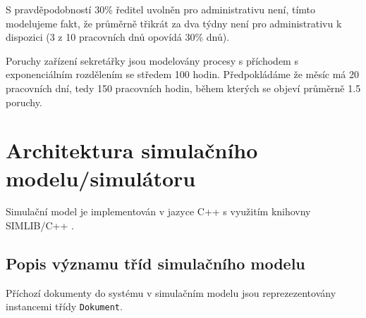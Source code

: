 \documentclass[12pt,a4paper]{article}
\begin{document}
S pravděpodobností 30\% ředitel uvolněn pro administrativu není, tímto modelujeme fakt, že průměrně třikrát za dva týdny není pro administrativu k dispozici (3 z 10 pracovních dnů opovídá 30\% dnů).

Poruchy zařízení sekretářky jsou modelovány procesy s příchodem s exponenciálním rozdělením se středem 100 hodin. Předpokládáme že měsíc má 20 pracovních dní, tedy 150 pracovních hodin, během kterých se objeví průměrně 1.5 poruchy.





\newpage


\section{Architektura simulačního modelu/simulátoru}

Simulační model je implementován v jazyce C++ s využitím knihovny SIMLIB/C++ \cite{simlib}.


\subsection{Popis významu tříd simulačního modelu}

Příchozí dokumenty do systému v simulačním modelu jsou reprezezentovány instancemi třídy {\tt Dokument}.
\end{document}
